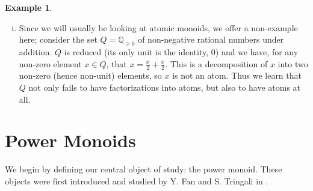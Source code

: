 \documentclass{report}
\newcommand{\F}{\mathscr{F}}
\newcommand{\NN}{\mathbb{N}}
\renewcommand{\:}{\text{:}}
\theoremstyle{definition}
\newtheorem{eg}[defn]{Example}
\begin{document}
\begin{eg}
\begin{enumerate}[(i)]
\begin{itemize}
\item \textit{Monoids of zero-sum sequences}: for a finite abelian group $G$, this monoid consists of formal words or ``sequences" in the elements of $G$ whose sums are equal to $0$.  
The interest in these monoids can be traced back to the study of the class group of a Dedekind domain (usually a ring of integers of a number field).  \textcolor{red}{[CITE SOME PAPERS]}

\item \textit{Integer-valued polynomials}: let $D$ be a domain with field of fractions $K$; then $\operatorname{Int}(D) := \{f(x) \in K[x]: f(D) \subseteq D \}$ is the ring of integer-valued polynomials of $D$.
In addition to the rich theory developed around understanding the prime ideal structure of this ring, it is amenable to the study of factorization behavior, and exhibits some surprising behaviors.  
For example, any finite subset of $\NN_{\ge2}$ can be realized as the set of factorization lengths of some polynomial $f(x)\in \operatorname{Int}(D)$.
Additionally, one can pose similar questions regarding the ring $\operatorname{Int}^\text{R}(D)$ of integer-valued rational functions. \textcolor{red}{[CITE SOME PAPERS]}
\end{itemize}
\item Since we will usually be looking at atomic monoids, we offer a non-example here; consider the set $Q = \mathbb{Q}_{\ge 0}$ of non-negative rational numbers under addition.
$Q$ is reduced (its only unit is the identity, $0$) and we have, for any non-zero element $x\in Q$, that $x = \frac{x}{2} + \frac{x}{2}$.
This is a decomposition of $x$ into two non-zero (hence non-unit) elements, so $x$ is not an atom.
Thus we learn that $Q$ not only fails to have factorizations into atoms, but also to have atoms at all.
\end{enumerate}
\end{eg}

\chapter{Power Monoids} \label{ch:power monoids}



We begin by defining our central object of study: the power monoid.
These objects were first introduced and studied by Y. Fan and S. Tringali in \cite{fan-tringali18}.
\end{document}
